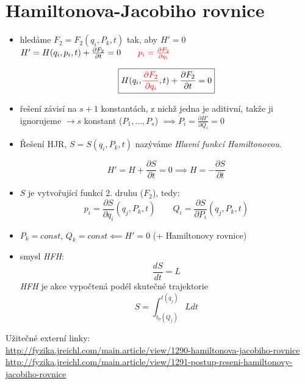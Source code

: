 \documentclass[a5paper,12pt]{article}
\begin{document}
\newpage

\section{Hamiltonova-Jacobiho rovnice}

\begin{itemize}[leftmargin=*]

\item 
hledáme $F_2 = F_2(q_i, P_k, t)$ tak, aby $H' = 0$\\

$H' = H(q_i, p_i, t) + \frac{\partial F_2}{\partial t} = 0 \qquad {\color{red} p_i = \frac{\partial F_2}{\partial q_i}}$

\begin{equation*}
\boxed{
	H(q_i, {\color{red} \frac{\partial F_2}{\partial q_i}}, t) + \frac{\partial F_2}{\partial t} = 0
}
\end{equation*}

\item řešení závisí na $s+1$ konstantách, z nichž jedna je aditivní, takže ji ignorujeme $\rightarrow s$ konstant ($P_1,...,P_s$) $\implies \dot{P}_i = \frac{\partial H'}{\partial Q_i} = 0$\\

\item Řešení HJR, $S = S(q_i, P_k, t)$ nazýváme \textit{Hlavní funkcí Hamiltonovou}.

\begin{equation*}
H' = H + \frac{\partial S}{\partial t} = 0 \implies H = -\frac{\partial S}{\partial t}
\end{equation*}

\item $S$ je vytvořující funkcí 2. druhu ($F_2$), tedy:
\begin{equation*}
p_i = \frac{\partial S}{\partial q_i}(q_j, P_k, t) \qquad
Q_i = \frac{\partial S}{\partial P_i}(q_j, P_k, t) 
\end{equation*}

\item $P_k = const$, $Q_k = const \impliedby H' = 0$ (+ Hamiltonovy rovnice)

\item smysl \textit{HFH}: 
\begin{equation*}
\frac{d S}{d t} = L 
\end{equation*}
\textit{HFH} je akce vypočtená podél skutečné trajektorie
\begin{equation*}
S = \int_{t_0(Q_j)}^{t(q_j)} L dt
\end{equation*}

\end{itemize}
Užitečné externí linky:\\
\url{http://fyzika.jreichl.com/main.article/view/1290-hamiltonova-jacobiho-rovnice} \\
\url{http://fyzika.jreichl.com/main.article/view/1291-postup-reseni-hamiltonovy-jacobiho-rovnice}
\end{document}
